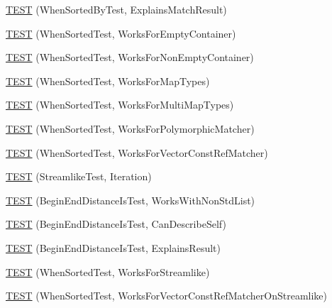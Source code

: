 \begin{DoxyCompactItemize}
\item 
\hyperlink{namespacetesting_1_1gmock__matchers__test_ada0850ab21beccb47802aab36c06d163}{T\+E\+ST} (When\+Sorted\+By\+Test, Explains\+Match\+Result)
\item 
\hyperlink{namespacetesting_1_1gmock__matchers__test_a76aaffd49c78fdee18f11fae5ea3f6fb}{T\+E\+ST} (When\+Sorted\+Test, Works\+For\+Empty\+Container)
\item 
\hyperlink{namespacetesting_1_1gmock__matchers__test_a2bfbef7e777d319e3d96fc98340bb558}{T\+E\+ST} (When\+Sorted\+Test, Works\+For\+Non\+Empty\+Container)
\item 
\hyperlink{namespacetesting_1_1gmock__matchers__test_acc4a96f3aa369fda8f554f5ac4495f4b}{T\+E\+ST} (When\+Sorted\+Test, Works\+For\+Map\+Types)
\item 
\hyperlink{namespacetesting_1_1gmock__matchers__test_ab5de36ad02781be67163ae24d08b5454}{T\+E\+ST} (When\+Sorted\+Test, Works\+For\+Multi\+Map\+Types)
\item 
\hyperlink{namespacetesting_1_1gmock__matchers__test_a587c3799433426782ccdcfe5cb07f5bc}{T\+E\+ST} (When\+Sorted\+Test, Works\+For\+Polymorphic\+Matcher)
\item 
\hyperlink{namespacetesting_1_1gmock__matchers__test_a0975bae51ce06a819dc1437134fd7f05}{T\+E\+ST} (When\+Sorted\+Test, Works\+For\+Vector\+Const\+Ref\+Matcher)
\item 
\hyperlink{namespacetesting_1_1gmock__matchers__test_a5aa4eed927d4a1a8ea306d5e47dce94f}{T\+E\+ST} (Streamlike\+Test, Iteration)
\item 
\hyperlink{namespacetesting_1_1gmock__matchers__test_add74820690e798ae8a365d08b68ddf71}{T\+E\+ST} (Begin\+End\+Distance\+Is\+Test, Works\+With\+Non\+Std\+List)
\item 
\hyperlink{namespacetesting_1_1gmock__matchers__test_aa4ef2a94a7d75aa6116e8537deaa5f56}{T\+E\+ST} (Begin\+End\+Distance\+Is\+Test, Can\+Describe\+Self)
\item 
\hyperlink{namespacetesting_1_1gmock__matchers__test_a89445da783c74dfa09c9c09531646f5b}{T\+E\+ST} (Begin\+End\+Distance\+Is\+Test, Explains\+Result)
\item 
\hyperlink{namespacetesting_1_1gmock__matchers__test_a8de8e3760418cfcd33913cd30f16d117}{T\+E\+ST} (When\+Sorted\+Test, Works\+For\+Streamlike)
\item 
\hyperlink{namespacetesting_1_1gmock__matchers__test_aa6bfe7b6cc288d93f60b9f52e095b233}{T\+E\+ST} (When\+Sorted\+Test, Works\+For\+Vector\+Const\+Ref\+Matcher\+On\+Streamlike)
\item 

\end{DoxyCompactItemize}
